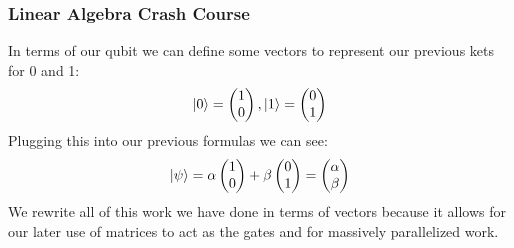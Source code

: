 \documentclass{beamer}
\begin{document}
\begin{frame}
\frametitle{Linear Algebra Crash Course}

In terms of our qubit we can define some vectors to represent our previous kets for 0 and 1:
\[
    \ket{0}=
    \begin{pmatrix}
    1 \\
    0
    \end{pmatrix}
    ,
    \ket{1}=
    \begin{pmatrix}
    0 \\
    1
    \end{pmatrix}
\]
Plugging this into our previous formulas we can see: 
\[
    \ket{\psi} = \alpha\begin{pmatrix} 1 \\ 0 \end{pmatrix} + \beta\begin{pmatrix} 0 \\ 1 \end{pmatrix} = \begin{pmatrix} \alpha \\ \beta \end{pmatrix}
\]
We rewrite all of this work we have done in terms of vectors because it allows for our later use of matrices to act as the gates and for massively parallelized work.

\end{frame}
\end{document}
